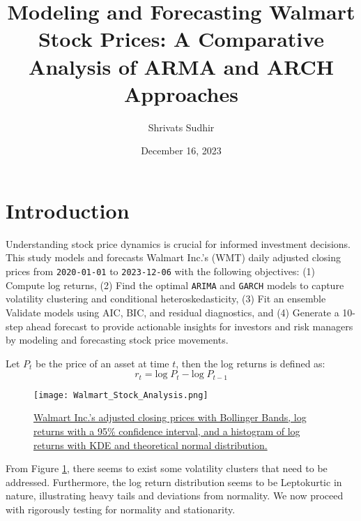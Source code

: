 \documentclass{article}
\newcommand{\1}{\mathbbm{1}}
\theoremstyle{definition}
\begin{document}
\title{\textbf{
    Modeling and Forecasting Walmart Stock Prices: A Comparative Analysis of ARMA and ARCH Approaches
}}

\author{Shrivats Sudhir}
\date{December 16, 2023}

\begin{titlingpage}
\maketitle
\end{titlingpage}


\newpage
{} %
\section{Introduction}

Understanding stock price dynamics is crucial for informed investment decisions. This study models and forecasts Walmart Inc.'s (WMT) daily adjusted closing prices from \texttt{2020-01-01} to \texttt{2023-12-06} with the following objectives: (1) Compute log returns, (2) Find the optimal \texttt{ARIMA} and \texttt{GARCH} models to capture volatility clustering and conditional heteroskedasticity, (3) Fit an ensemble Validate models using AIC, BIC, and residual diagnostics, and (4) Generate a 10-step ahead forecast to provide actionable insights for investors and risk managers by modeling and forecasting stock price movements.

Let $P_t$ be the price of an asset at time $t$, then the log returns is defined as:
$$r_t = \text{log}\;P_t - \text{log}\;P_{t-1}$$

\begin{figure}[H]
\centering
\texttt{[image: Walmart\_Stock\_Analysis.png]}
\caption{\small{\href{https://github.com/Stochastic1017/Walmart-Stock-Forecasting/blob/main/R/Plot_AdjClose_LogReturns.R}{Walmart Inc.'s adjusted closing prices with Bollinger Bands, log returns with a 95\% confidence interval, and a histogram of log returns with KDE and theoretical normal distribution.}}}
\label{fig:adjclose_adjreturns_plot}
\end{figure}

From Figure \ref{fig:adjclose_adjreturns_plot}, there seems to exist some volatility clusters that need to be addressed. Furthermore, the log return distribution seems to be Leptokurtic in nature, illustrating heavy tails and deviations from normality. We now proceed with rigorously testing for normality and stationarity.
\end{document}
